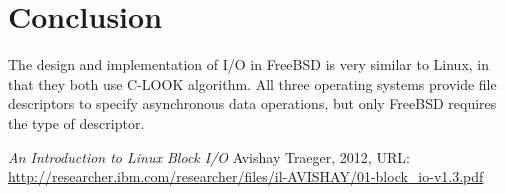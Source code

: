 \documentclass[letterpaper,draftclsnofoot,10pt,onecolumn,titlepage]{IEEEtran}\usepackage[margin=0.75in]{geometry}
\begin{document}
\section{Conclusion}
The design and implementation of I/O in FreeBSD is very similar to Linux, in that they both use C-LOOK algorithm.
All three operating systems provide file descriptors to specify asynchronous data operations, but only FreeBSD
requires the type of descriptor.

\begin{thebibliography}{1}

    \textit{An Introduction to Linux Block I/O}
    Avishay Traeger, 2012, URL: \url{http://researcher.ibm.com/researcher/files/il-AVISHAY/01-block_io-v1.3.pdf}

\end{thebibliography}
\end{document}
